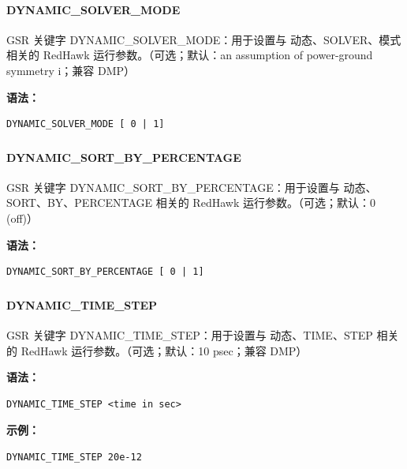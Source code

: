 \paragraph*{DYNAMIC_SOLVER_MODE}

GSR 关键字 DYNAMIC_SOLVER_MODE：用于设置与 动态、SOLVER、模式 相关的 RedHawk 运行参数。（可选；默认：an assumption of power-ground symmetry i；兼容 DMP）

\textbf{语法：}
\begin{lstlisting}
DYNAMIC_SOLVER_MODE [ 0 | 1]
\end{lstlisting}

\subsubsection{}
\paragraph*{DYNAMIC_SORT_BY_PERCENTAGE}

GSR 关键字 DYNAMIC_SORT_BY_PERCENTAGE：用于设置与 动态、SORT、BY、PERCENTAGE 相关的 RedHawk 运行参数。（可选；默认：0 (off)）

\textbf{语法：}
\begin{lstlisting}
DYNAMIC_SORT_BY_PERCENTAGE [ 0 | 1]
\end{lstlisting}

\subsubsection{}
\paragraph*{DYNAMIC_TIME_STEP}

GSR 关键字 DYNAMIC_TIME_STEP：用于设置与 动态、TIME、STEP 相关的 RedHawk 运行参数。（可选；默认：10 psec；兼容 DMP）

\textbf{语法：}
\begin{lstlisting}
DYNAMIC_TIME_STEP <time in sec>
\end{lstlisting}

\textbf{示例：}
\begin{lstlisting}
DYNAMIC_TIME_STEP 20e-12
\end{lstlisting}

\subsubsection{}
